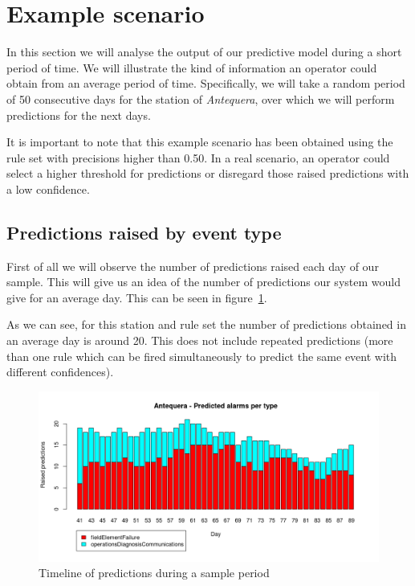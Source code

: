 \section{Example scenario}
\label{sec:scenario}

In this section we will analyse the output of our predictive model during a short period of time. We will illustrate the kind of information an operator could obtain from an average period of time. Specifically, we will take a random period of 50 consecutive days for the station of \emph{Antequera}, over which we will perform predictions for the next days.

It is important to note that this example scenario has been obtained using the rule set with precisions higher than 0.50. In a real scenario, an operator could select a higher threshold for predictions or disregard those raised predictions with a low confidence.

\subsection{Predictions raised by event type}
First of all we will observe the number of predictions raised each day of our sample. This will give us an idea of the number of predictions our system would give for an average day. This can be seen in figure~\ref{fig:scenario_pred_categories}.

As we can see, for this station and rule set the number of predictions obtained in an average day is around 20. This does not include repeated predictions (more than one rule which can be fired simultaneously to predict the same event with different confidences).

\begin{figure}[hbtp]
\includegraphics[width=\textwidth]{img/scenario_pred_categories.png}
\caption{Timeline of predictions during a sample period} \label{fig:scenario_pred_categories}
\end{figure}

